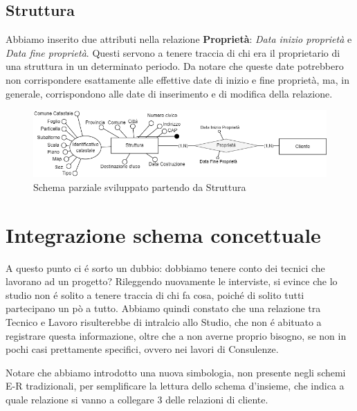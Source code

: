 \documentclass{elegantbook}
\begin{document}
            
            \subsection{Struttura}
            
            Abbiamo inserito due attributi nella relazione \textbf{Proprietà}: \textit{Data inizio proprietà} e \textit{Data fine proprietà}. Questi servono a tenere traccia di chi era il proprietario di una struttura in un determinato periodo.
            Da notare che queste date potrebbero non corrispondere esattamente alle effettive date di inizio e fine proprietà, ma, in generale, corrispondono alle date di inserimento e di modifica della relazione.
            
            \begin{figure}[H]
            	\includegraphics[scale=0.7]{../Img/DBSchemes/struttura-completo.png} 
                \caption{Schema parziale sviluppato partendo da Struttura}
            \end{figure}
            
            
        
	\section{Integrazione schema concettuale}
        A questo punto ci é sorto un dubbio: dobbiamo tenere conto dei tecnici che lavorano ad un progetto?
        Rileggendo nuovamente le interviste, si evince che lo studio non é solito a tenere traccia di chi fa cosa, poiché di
        solito tutti partecipano un pò a tutto. Abbiamo quindi constato che una relazione tra Tecnico e Lavoro risulterebbe
        di intralcio allo Studio, che non é abituato a registrare questa informazione, oltre che a non averne proprio
        bisogno, se non in pochi casi prettamente specifici, ovvero nei lavori di Consulenze.  

        Notare che abbiamo introdotto una nuova simbologia, non presente negli schemi E-R tradizionali, per semplificare la lettura dello schema d'insieme, che indica a
        quale relazione si vanno a collegare 3 delle relazioni di cliente.
        
\end{document}
